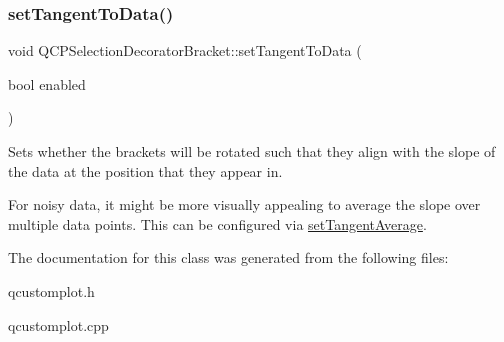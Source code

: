 \subsubsection{\texorpdfstring{set\+Tangent\+To\+Data()}{setTangentToData()}}
{\footnotesize\ttfamily void Q\+C\+P\+Selection\+Decorator\+Bracket\+::set\+Tangent\+To\+Data (\begin{DoxyParamCaption}\item[{bool}]{enabled }\end{DoxyParamCaption})}

Sets whether the brackets will be rotated such that they align with the slope of the data at the position that they appear in.

For noisy data, it might be more visually appealing to average the slope over multiple data points. This can be configured via \hyperlink{classQCPSelectionDecoratorBracket_adb2d0876f25a77c88042b70818f1d6e4}{set\+Tangent\+Average}. 

The documentation for this class was generated from the following files\+:\begin{DoxyCompactItemize}
\item 
qcustomplot.\+h\item 
qcustomplot.\+cpp\end{DoxyCompactItemize}
